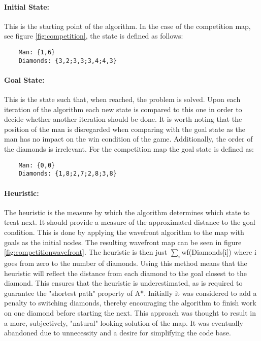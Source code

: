 \paragraph{Initial State:}
\label{sec:initialstate}
This is the starting point of the algorithm. 
In the case of the competition map, see figure \ref{fig:competition}, the state is defined as follows:

\begin{lstlisting}
	Man: {1,6}
	Diamonds: {3,2;3,3;3,4;4,3}
\end{lstlisting}

\paragraph{Goal State:}
This is the state such that, when reached, the problem is solved. 
Upon each iteration of the algorithm each new state is compared to this one in order to decide whether another iteration should be done.
It is worth noting that the position of the man is disregarded when comparing with the goal state as the man has no impact on the win condition of the game.
Additionally, the order of the diamonds is irrelevant.
For the competition map the goal state is defined as:

\begin{lstlisting}
	Man: {0,0}
	Diamonds: {1,8;2,7;2,8;3,8}
\end{lstlisting}

\paragraph{Heuristic:}
The heuristic is the measure by which the algorithm determines which state to treat next.
It should provide a measure of the approximated distance to the goal condition. 
This is done by applying the wavefront algorithm to the map with goals as the initial nodes.
The resulting wavefront map can be seen in figure \ref{fig:competitionwavefront}.
The heuristic is then just $\sum_{i}$wf(Diamonds[i]) where i goes from zero to the number of diamonds.
Using this method means that the heuristic will reflect the distance from each diamond to the goal closest to the diamond. 
This ensures that the heuristic is underestimated, as is required to guarantee the "shortest path" property of A*.
Initially it was considered to add a penalty to switching diamonds, thereby encouraging the algorithm to finish work on one diamond before starting the next.
This approach was thought to result in a more, subjectively, "natural" looking solution of the map.
It was eventually abandoned due to unnecessity and a desire for simplifying the code base.

